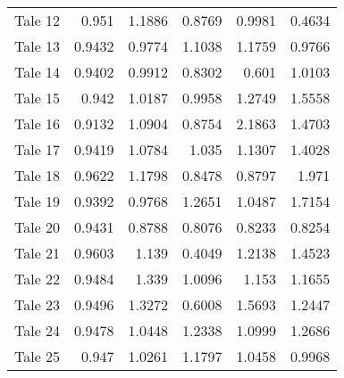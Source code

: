 \begin{table}[h]
\begin{tabular}{lrrrrr}
 Tale 12 &                        0.951  &                      1.1886 &                        0.8769 &                          0.9981 &                         0.4634 \\
 Tale 13 &                        0.9432 &                      0.9774 &                        1.1038 &                          1.1759 &                         0.9766 \\
 Tale 14 &                        0.9402 &                      0.9912 &                        0.8302 &                          0.601  &                         1.0103 \\
 Tale 15 &                        0.942  &                      1.0187 &                        0.9958 &                          1.2749 &                         1.5558 \\
 Tale 16 &                        0.9132 &                      1.0904 &                        0.8754 &                          2.1863 &                         1.4703 \\
 Tale 17 &                        0.9419 &                      1.0784 &                        1.035  &                          1.1307 &                         1.4028 \\
 Tale 18 &                        0.9622 &                      1.1798 &                        0.8478 &                          0.8797 &                         1.971  \\
 Tale 19 &                        0.9392 &                      0.9768 &                        1.2651 &                          1.0487 &                         1.7154 \\
 Tale 20 &                        0.9431 &                      0.8788 &                        0.8076 &                          0.8233 &                         0.8254 \\
 Tale 21 &                        0.9603 &                      1.139  &                        0.4049 &                          1.2138 &                         1.4523 \\
 Tale 22 &                        0.9484 &                      1.339  &                        1.0096 &                          1.153  &                         1.1655 \\
 Tale 23 &                        0.9496 &                      1.3272 &                        0.6008 &                          1.5693 &                         1.2447 \\
 Tale 24 &                        0.9478 &                      1.0448 &                        1.2338 &                          1.0999 &                         1.2686 \\
 Tale 25 &                        0.947  &                      1.0261 &                        1.1797 &                          1.0458 &                         0.9968 \\
\bottomrule
\end{tabular}
\end{table}